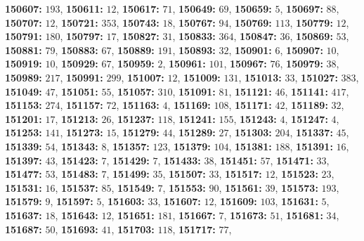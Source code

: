 \textsf{\bfseries 150607:} $193$, \textsf{\bfseries 150611:} $12$, \textsf{\bfseries 150617:} $71$, \textsf{\bfseries 150649:} $69$, \textsf{\bfseries 150659:} $5$, \textsf{\bfseries 150697:} $88$, \textsf{\bfseries 150707:} $12$, \textsf{\bfseries 150721:} $353$, \textsf{\bfseries 150743:} $18$, \textsf{\bfseries 150767:} $94$, \textsf{\bfseries 150769:} $113$, \textsf{\bfseries 150779:} $12$, \textsf{\bfseries 150791:} $180$, \textsf{\bfseries 150797:} $17$, \textsf{\bfseries 150827:} $31$, \textsf{\bfseries 150833:} $364$, \textsf{\bfseries 150847:} $36$, \textsf{\bfseries 150869:} $53$, \textsf{\bfseries 150881:} $79$, \textsf{\bfseries 150883:} $67$, \textsf{\bfseries 150889:} $191$, \textsf{\bfseries 150893:} $32$, \textsf{\bfseries 150901:} $6$, \textsf{\bfseries 150907:} $10$, \textsf{\bfseries 150919:} $10$, \textsf{\bfseries 150929:} $67$, \textsf{\bfseries 150959:} $2$, \textsf{\bfseries 150961:} $101$, \textsf{\bfseries 150967:} $76$, \textsf{\bfseries 150979:} $38$, \textsf{\bfseries 150989:} $217$, \textsf{\bfseries 150991:} $299$, \textsf{\bfseries 151007:} $12$, \textsf{\bfseries 151009:} $131$, \textsf{\bfseries 151013:} $33$, \textsf{\bfseries 151027:} $383$, \textsf{\bfseries 151049:} $47$, \textsf{\bfseries 151051:} $55$, \textsf{\bfseries 151057:} $310$, \textsf{\bfseries 151091:} $81$, \textsf{\bfseries 151121:} $46$, \textsf{\bfseries 151141:} $417$, \textsf{\bfseries 151153:} $274$, \textsf{\bfseries 151157:} $72$, \textsf{\bfseries 151163:} $4$, \textsf{\bfseries 151169:} $108$, \textsf{\bfseries 151171:} $42$, \textsf{\bfseries 151189:} $32$, \textsf{\bfseries 151201:} $17$, \textsf{\bfseries 151213:} $26$, \textsf{\bfseries 151237:} $118$, \textsf{\bfseries 151241:} $155$, \textsf{\bfseries 151243:} $4$, \textsf{\bfseries 151247:} $4$, \textsf{\bfseries 151253:} $141$, \textsf{\bfseries 151273:} $15$, \textsf{\bfseries 151279:} $44$, \textsf{\bfseries 151289:} $27$, \textsf{\bfseries 151303:} $204$, \textsf{\bfseries 151337:} $45$, \textsf{\bfseries 151339:} $54$, \textsf{\bfseries 151343:} $8$, \textsf{\bfseries 151357:} $123$, \textsf{\bfseries 151379:} $104$, \textsf{\bfseries 151381:} $188$, \textsf{\bfseries 151391:} $16$, \textsf{\bfseries 151397:} $43$, \textsf{\bfseries 151423:} $7$, \textsf{\bfseries 151429:} $7$, \textsf{\bfseries 151433:} $38$, \textsf{\bfseries 151451:} $57$, \textsf{\bfseries 151471:} $33$, \textsf{\bfseries 151477:} $53$, \textsf{\bfseries 151483:} $7$, \textsf{\bfseries 151499:} $35$, \textsf{\bfseries 151507:} $33$, \textsf{\bfseries 151517:} $12$, \textsf{\bfseries 151523:} $23$, \textsf{\bfseries 151531:} $16$, \textsf{\bfseries 151537:} $85$, \textsf{\bfseries 151549:} $7$, \textsf{\bfseries 151553:} $90$, \textsf{\bfseries 151561:} $39$, \textsf{\bfseries 151573:} $193$, \textsf{\bfseries 151579:} $9$, \textsf{\bfseries 151597:} $5$, \textsf{\bfseries 151603:} $33$, \textsf{\bfseries 151607:} $12$, \textsf{\bfseries 151609:} $103$, \textsf{\bfseries 151631:} $5$, \textsf{\bfseries 151637:} $18$, \textsf{\bfseries 151643:} $12$, \textsf{\bfseries 151651:} $181$, \textsf{\bfseries 151667:} $7$, \textsf{\bfseries 151673:} $51$, \textsf{\bfseries 151681:} $34$, \textsf{\bfseries 151687:} $50$, \textsf{\bfseries 151693:} $41$, \textsf{\bfseries 151703:} $118$, \textsf{\bfseries 151717:} $77$, 
